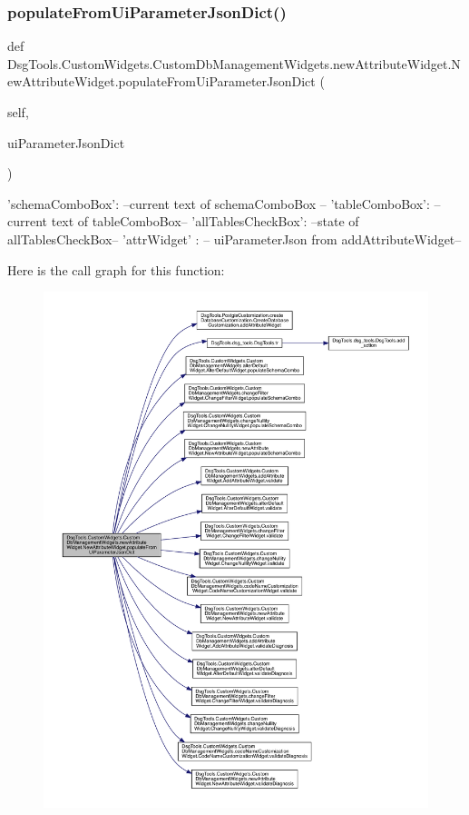 \subsubsection{\texorpdfstring{populate\+From\+Ui\+Parameter\+Json\+Dict()}{populateFromUiParameterJsonDict()}}
{\footnotesize\ttfamily def Dsg\+Tools.\+Custom\+Widgets.\+Custom\+Db\+Management\+Widgets.\+new\+Attribute\+Widget.\+New\+Attribute\+Widget.\+populate\+From\+Ui\+Parameter\+Json\+Dict (\begin{DoxyParamCaption}\item[{}]{self,  }\item[{}]{ui\+Parameter\+Json\+Dict }\end{DoxyParamCaption})}

\begin{DoxyVerb}{
    'schemaComboBox': --current text of schemaComboBox --
    'tableComboBox': --current text of tableComboBox--
    'allTablesCheckBox': --state of allTablesCheckBox--
    'attrWidget' : -- uiParameterJson from addAttributeWidget--
}
\end{DoxyVerb}
 Here is the call graph for this function\+:
\nopagebreak
\begin{figure}[H]
\begin{center}
\leavevmode
\includegraphics[width=350pt]{class_dsg_tools_1_1_custom_widgets_1_1_custom_db_management_widgets_1_1new_attribute_widget_1_1_new_attribute_widget_a5e18f5473b9c2210a03b1b9afc55fb03_cgraph}
\end{center}
\end{figure}
